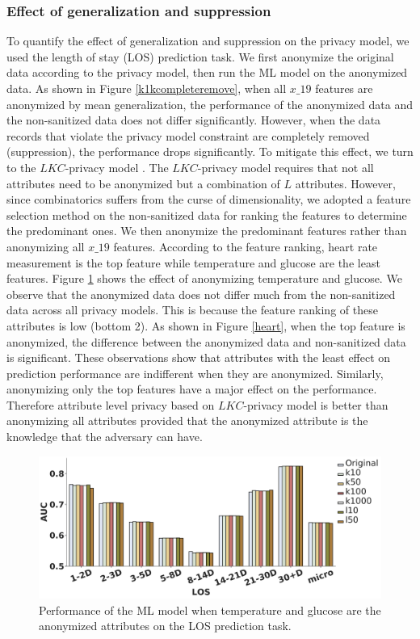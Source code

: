 \documentclass{bioinfo}
\begin{document}
\subsubsection{Effect of generalization and suppression}
To quantify the effect of generalization and suppression on the privacy model, we used the length of stay (LOS) prediction task. We first anonymize the original data according to the privacy model, then run the ML model on the anonymized data.
As shown in Figure \ref{k1kcompleteremove}, when all $x\_19$ features are anonymized by mean generalization, the performance of the anonymized data and the non-sanitized data does not differ significantly. However, when the data records that violate the privacy model constraint are completely removed (suppression), the performance drops significantly. To mitigate this effect, we turn to the $LKC$-privacy model \cite{cite732mohammed2010centralized}. The $LKC$-privacy model \cite{cite732mohammed2010centralized} requires that not all attributes need to be anonymized but a combination of $L$ attributes. However, since combinatorics suffers from the curse of dimensionality, we adopted a feature selection method on the non-sanitized data for ranking the features to determine the predominant ones. We then anonymize the predominant features rather than anonymizing all $x\_19$ features. According to the feature ranking, heart rate measurement is the top feature while temperature and glucose are the least features. Figure \ref{tempglu} shows the effect of anonymizing temperature and glucose. We observe that the anonymized data does not differ much from the non-sanitized data across all privacy models. This is because the feature ranking of these attributes is low (bottom 2). As shown in Figure \ref{heart}, when the top feature is anonymized, the difference between the anonymized data and non-sanitized data is significant. These observations show that attributes with the least effect on prediction performance are indifferent when they are anonymized. Similarly, anonymizing only the top features have a major effect on the performance.
Therefore attribute level privacy based on $LKC$-privacy model is better than anonymizing all attributes provided that the anonymized attribute is the knowledge that the adversary can have.


\begin{figure}[!tpb]%
\centerline{\includegraphics[width=\linewidth]{los_pred_tempglu.pdf}}
\caption{Performance of the ML model when temperature and glucose are the anonymized attributes on the LOS prediction task.}\label{tempglu}
\end{figure}
\end{document}
